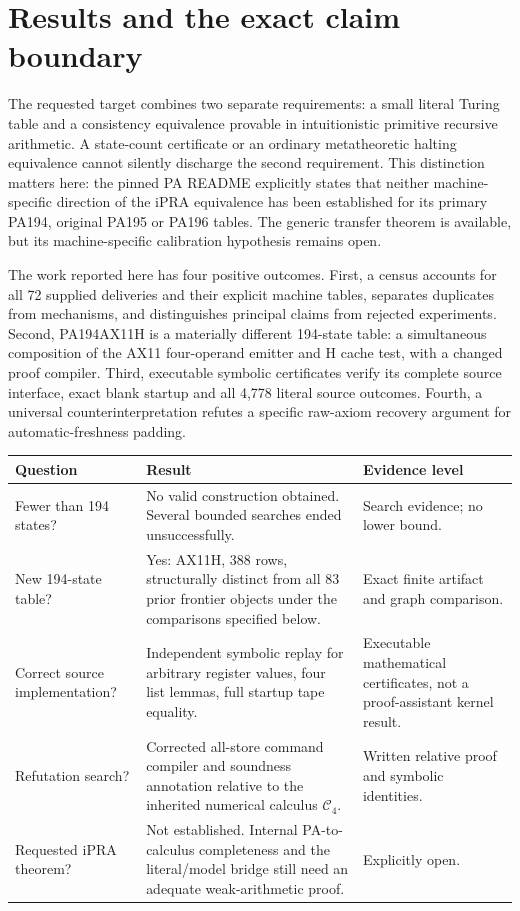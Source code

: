 \documentclass[11pt,a4paper]{article}
\begin{document}
\hypersetup{pageanchor=true}
\tableofcontents
\clearpage
{}

\section{Results and the exact claim boundary}
\label{sec:outcome}

The requested target combines two separate requirements: a small literal
Turing table and a consistency equivalence provable in intuitionistic
primitive recursive arithmetic. A state-count certificate or an ordinary
metatheoretic halting equivalence cannot silently discharge the second
requirement. This distinction matters here: the pinned PA README explicitly
states that neither machine-specific direction of the iPRA equivalence has
been established for its primary PA194, original PA195 or PA196 tables.
The generic transfer theorem is available, but its machine-specific
calibration hypothesis remains open.\cite{pa-readme,ipra-generic}

The work reported here has four positive outcomes.
First, a census accounts for all 72 supplied deliveries and their explicit
machine tables, separates duplicates from mechanisms, and distinguishes
principal claims from rejected experiments. Second, PA194AX11H is a
materially different 194-state table: a simultaneous composition of the
AX11 four-operand emitter and H cache test, with a changed proof compiler.
Third, executable symbolic certificates verify its complete source
interface, exact blank startup and all 4,778 literal source outcomes.
Fourth, a universal counterinterpretation refutes a specific raw-axiom
recovery argument for automatic-freshness padding.

\begin{center}
\begin{tabularx}{\textwidth}{L{.24\textwidth} X L{.21\textwidth}}
\toprule
Question & Result & Evidence level\\
\midrule
Fewer than 194 states? & No valid construction obtained. Several bounded
searches ended unsuccessfully. & Search evidence; no lower bound.\\
New 194-state table? & Yes: AX11H, 388 rows, structurally distinct from all
83 prior frontier objects under the comparisons specified below. & Exact
finite artifact and graph comparison.\\
Correct source implementation? & Independent symbolic replay for arbitrary
register values, four list lemmas, full startup tape equality. & Executable
mathematical certificates, not a proof-assistant kernel result.\\
Refutation search? & Corrected all-store command compiler and soundness
annotation relative to the inherited numerical calculus $\mathcal C_4$. &
Written relative proof and symbolic identities.\\
Requested iPRA theorem? & Not established. Internal PA-to-calculus
completeness and the literal/model bridge still need an adequate weak-arithmetic
proof. & Explicitly open.\\
\bottomrule
\end{tabularx}
\end{center}
\end{document}
